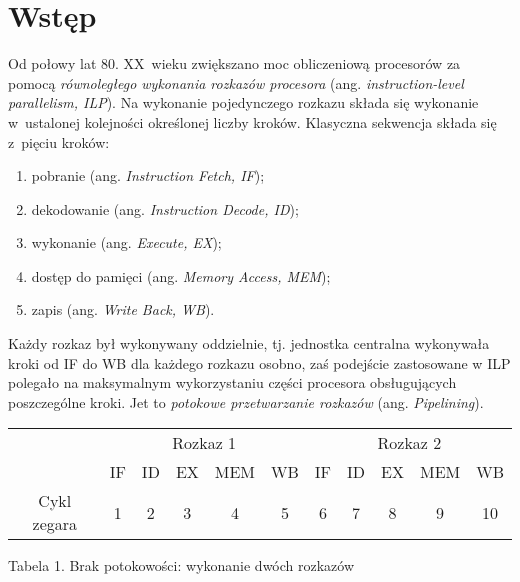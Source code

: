 \documentclass{mwart}
\begin{document}
\section{Wstęp}
%
\indent 
	Od połowy lat 80. XX~wieku zwiększano moc obliczeniową procesorów za pomocą \emph{równoległego wykonania rozkazów procesora}
	(ang. \emph{instruction-level parallelism, ILP}). Na wykonanie pojedynczego rozkazu składa się wykonanie w~ustalonej kolejności
	określonej liczby kroków. Klasyczna sekwencja składa się z~pięciu kroków:
	\begin{enumerate}
	\item pobranie (ang. \emph{Instruction Fetch, IF});
	\item dekodowanie (ang. \emph{Instruction Decode, ID});
	\item wykonanie (ang. \emph{Execute, EX});
	\item dostęp do pamięci (ang. \emph{Memory Access, MEM});
	\item zapis (ang. \emph{Write Back, WB}).
	\end{enumerate}
	Każdy rozkaz był wykonywany oddzielnie, tj. jednostka centralna wykonywała kroki od IF do WB dla każdego rozkazu osobno, zaś
	podejście zastosowane w ILP polegało na maksymalnym wykorzystaniu części procesora obsługujących poszczególne kroki.
	Jet to \emph{potokowe przetwarzanie rozkazów} (ang. \emph{Pipelining}).
	\begin{center}
	\begin{tabular}{|c|c|c|c|c|c|c|c|c|c|c|} \hline
	& \multicolumn{5}{c|}{Rozkaz 1} & \multicolumn{5}{c|}{Rozkaz 2}  \\ \cline{2-11}
	& IF & ID & \cellcolor{yellow} EX & MEM & WB & IF & ID & EX & MEM & WB\\ \cline{2-11} \cline{2-11}
	Cykl zegara & 1 & 2 & \cellcolor{yellow} 3 & 4 & 5 & 6 & 7 & 8 & 9 & 10 \\ \hline
	\end{tabular}\par
	\begin{small} Tabela 1. Brak potokowości: wykonanie dwóch rozkazów \end{small} \par
	\end{center}\par
\end{document}

